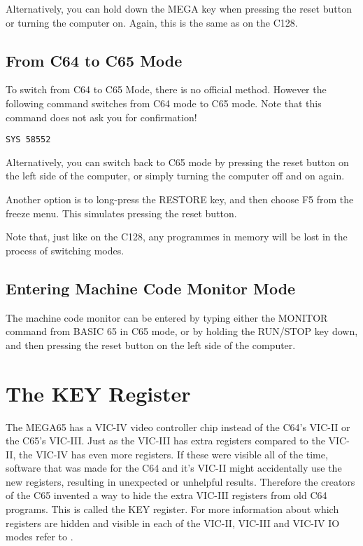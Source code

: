 Alternatively, you can hold down the MEGA key when pressing the reset button or turning the computer on. Again,
this is the same as on the C128.

\subsection{From C64 to C65 Mode}

To switch from C64 to C65 Mode, there is no official method.  However the following command switches from C64 mode to C65 mode.
Note that this command
does not ask you for confirmation!

\begin{tcolorbox}[colback=black,coltext=white]
\verbatimfont{\codefont}
\begin{verbatim}
SYS 58552
\end{verbatim}
\end{tcolorbox}

Alternatively, you can switch back to C65 mode by pressing the reset
button on the left side of the computer, or simply turning the
computer off and on again.

Another option is to long-press the RESTORE key, and then choose F5
from the freeze menu.  This simulates pressing the reset button.

Note that, just like on the C128, any programmes in memory will be
lost in the process of switching modes.

\subsection{Entering Machine Code Monitor Mode}

The machine code monitor can be entered by typing either the MONITOR
command from BASIC 65 in C65 mode, or by holding the RUN/STOP key
down, and then pressing the reset button on the left side of the
computer.

\section{The KEY Register}

The MEGA65 has a VIC-IV video controller chip instead of the C64's VIC-II or
the C65's VIC-III.  Just as the VIC-III has extra registers compared to the
VIC-II, the VIC-IV has even more registers.  If these were visible all of the time,
software that was made for the C64 and it's VIC-II might accidentally use the
new registers, resulting in unexpected or unhelpful results.  Therefore the
creators of the C65 invented a way to hide the extra VIC-III registers from old
C64 programs. This is called the KEY register. For more information
about which registers are hidden and visible in each of the
VIC-II, VIC-III and VIC-IV IO modes refer to .

